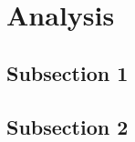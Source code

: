 \chapter{Analysis}
\lipsum[3]
\cite{coplienAOSDObjects}

\section{Subsection 1}
\lipsum[8]
\cite{opensourceArch}

\section{Subsection 2}
\lipsum[6]
\cite{coplienGOTODCI, coplienOredevDCI}
\lipsum[5]
\cite{generativeProg}